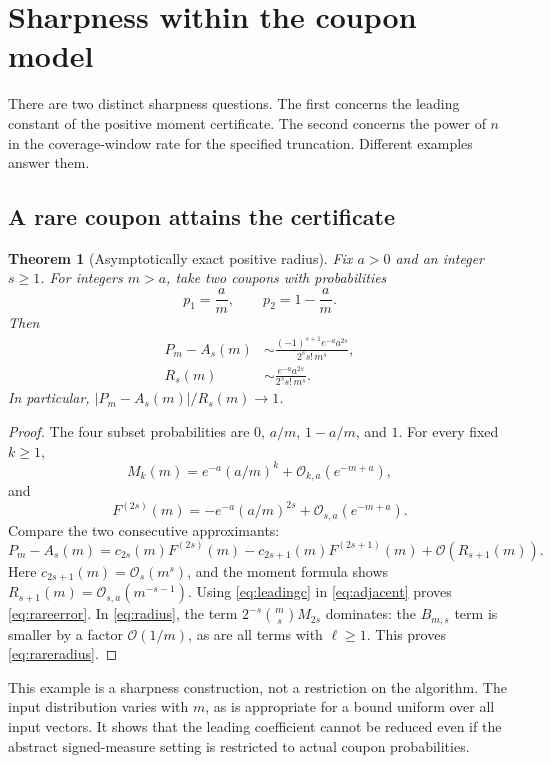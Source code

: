 \documentclass[11pt,a4paper]{article}
\newtheorem{theorem}{Theorem}[section]
\theoremstyle{definition}
\newcommand{\bigO}{\mathcal O}
\begin{document}
\section{Sharpness within the coupon model}\label{sec:sharpness}

There are two distinct sharpness questions. The first concerns the leading
constant of the positive moment certificate. The second concerns the
power of $n$ in the coverage-window rate for the specified truncation.
Different examples answer them.

\subsection{A rare coupon attains the certificate}

\begin{theorem}[Asymptotically exact positive radius]\label{thm:rare}
Fix $a>0$ and an integer $s\ge1$. For integers $m>a$, take two coupons
with probabilities
\[
 p_1=\frac am,\qquad p_2=1-\frac am.
\]
Then
\begin{align}
 P_m-A_s(m)&\sim
       \frac{(-1)^{s+1}e^{-a}a^{2s}}{2^s s!\,m^s},
       \label{eq:rareerror}\\
 R_s(m)&\sim\frac{e^{-a}a^{2s}}{2^s s!\,m^s}.
       \label{eq:rareradius}
\end{align}
In particular, $|P_m-A_s(m)|/R_s(m)\to1$.
\end{theorem}
\begin{proof}
The four subset probabilities are $0$, $a/m$, $1-a/m$, and $1$.
For every fixed $k\ge1$,
\[
 M_k(m)=e^{-a}(a/m)^k+\bigO_{k,a}(e^{-m+a}),
\]
and
\[
 F^{(2s)}(m)=-e^{-a}(a/m)^{2s}
                           +\bigO_{s,a}(e^{-m+a}).
\]
Compare the two consecutive approximants:
\begin{equation}\label{eq:adjacent}
 P_m-A_s(m)
  =c_{2s}(m)F^{(2s)}(m)
   -c_{2s+1}(m)F^{(2s+1)}(m)
   +\bigO(R_{s+1}(m)).
\end{equation}
Here $c_{2s+1}(m)=\bigO_s(m^s)$, and the moment formula shows
$R_{s+1}(m)=\bigO_{s,a}(m^{-s-1})$. Using
\eqref{eq:leadingc} in \eqref{eq:adjacent} proves
\eqref{eq:rareerror}. In \eqref{eq:radius}, the term
$2^{-s}\binom ms M_{2s}$ dominates: the $B_{m,s}$ term is smaller
by a factor $\bigO(1/m)$, as are all terms with $\ell\ge1$.
This proves \eqref{eq:rareradius}.
\end{proof}

This example is a sharpness construction, not a restriction on the
algorithm. The input distribution varies with $m$, as is appropriate for
a bound uniform over all input vectors. It shows that the leading
coefficient cannot be reduced even if the abstract signed-measure setting
is restricted to actual coupon probabilities.
\end{document}
